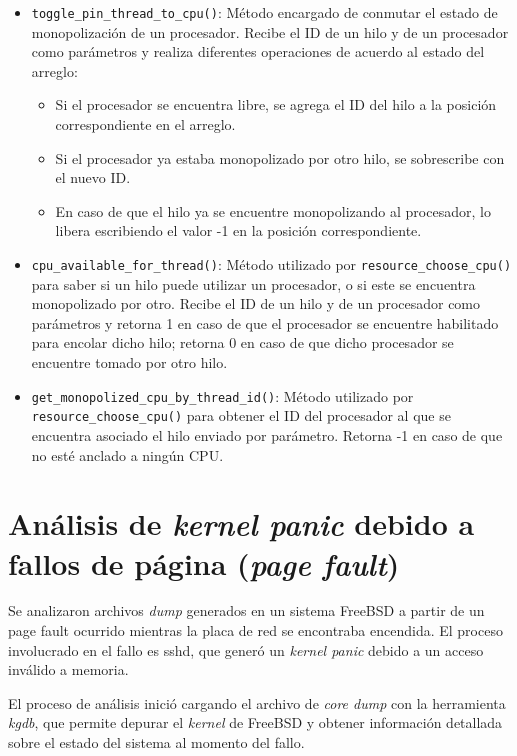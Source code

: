 \begin{itemize}
    \item \verb|toggle_pin_thread_to_cpu()|: Método encargado de conmutar el estado de monopolización de un procesador. Recibe el ID de un hilo y de un procesador como parámetros y realiza diferentes operaciones de acuerdo al estado del arreglo:
          \begin{itemize}
              \item Si el procesador se encuentra libre, se agrega el ID del hilo a la posición correspondiente en el arreglo.
              \item Si el procesador ya estaba monopolizado por otro hilo, se sobrescribe con el nuevo ID.
              \item En caso de que el hilo ya se encuentre monopolizando al procesador, lo libera escribiendo el valor -1 en la posición correspondiente.
          \end{itemize}
    \item \verb|cpu_available_for_thread()|: Método utilizado por \verb|resource_choose_cpu()| para saber si un hilo puede utilizar un procesador, o si este se encuentra monopolizado por otro. Recibe el ID de un hilo y de un procesador como parámetros y retorna 1 en caso de que el procesador se encuentre habilitado para encolar dicho hilo; retorna 0 en caso de que dicho procesador se encuentre tomado por otro hilo.
    \item \verb|get_monopolized_cpu_by_thread_id()|: Método utilizado por \verb|resource_choose_cpu()| para obtener el ID del procesador al que se encuentra asociado el hilo enviado por parámetro. Retorna -1 en caso de que no esté anclado a ningún CPU.\par
\end{itemize}

\chapter{Análisis de \textit{kernel panic} debido a fallos de página (\textit{page fault})}\label{appendix:apC}

Se analizaron archivos \textit{dump} generados en un sistema FreeBSD a partir de un page fault ocurrido mientras la placa de red se encontraba encendida. El proceso involucrado en el fallo es sshd, que generó un \textit{kernel panic} debido a un acceso inválido a memoria.

El proceso de análisis inició cargando el archivo de \textit{core dump} con la herramienta \textit{kgdb}, que permite depurar el \textit{kernel} de FreeBSD y obtener información detallada sobre el estado del sistema al momento del fallo.

